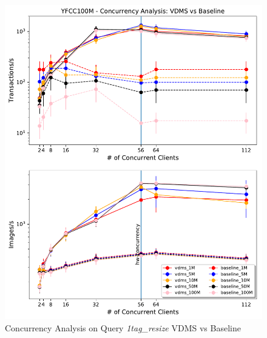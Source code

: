 \begin{figure}[]
\centering
\includegraphics[width=\columnwidth]{figures/concurrency_comparison}
\caption{Concurrency Analysis on Query \textit{1tag\_resize} \- VDMS vs Baseline}
\label{fig:concurrency_comparison}
\end{figure}


